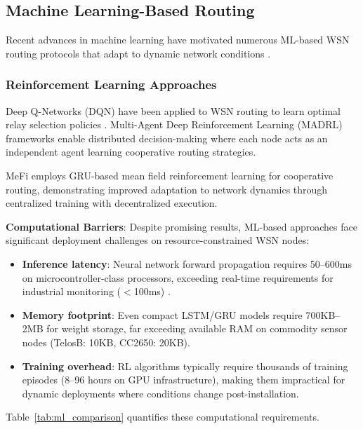 \subsection{Machine Learning-Based Routing}

Recent advances in machine learning have motivated numerous ML-based WSN
routing protocols that adapt to dynamic network conditions
\cite{ren2024mefi, okine2024madrl}.

\subsubsection{Reinforcement Learning Approaches}

Deep Q-Networks (DQN) have been applied to WSN routing to learn optimal
relay selection policies \cite{okine2024madrl}. Multi-Agent Deep
Reinforcement Learning (MADRL) frameworks enable distributed decision-making
where each node acts as an independent agent learning cooperative routing
strategies.

MeFi \cite{ren2024mefi} employs GRU-based mean field reinforcement learning
for cooperative routing, demonstrating improved adaptation to network
dynamics through centralized training with decentralized execution.

\textbf{Computational Barriers}: Despite promising results, ML-based
approaches face significant deployment challenges on resource-constrained
WSN nodes:

\begin{itemize}
    \item \textbf{Inference latency}: Neural network forward propagation
    requires 50--600ms on microcontroller-class processors, exceeding
    real-time requirements for industrial monitoring ($<$100ms)
    \cite{kumar2020tinyml}.

    \item \textbf{Memory footprint}: Even compact LSTM/GRU models require
    700KB--2MB for weight storage, far exceeding available RAM on commodity
    sensor nodes (TelosB: 10KB, CC2650: 20KB).

    \item \textbf{Training overhead}: RL algorithms typically require
    thousands of training episodes (8--96 hours on GPU infrastructure),
    making them impractical for dynamic deployments where conditions
    change post-installation.
\end{itemize}

Table~\ref{tab:ml_comparison} quantifies these computational requirements.

